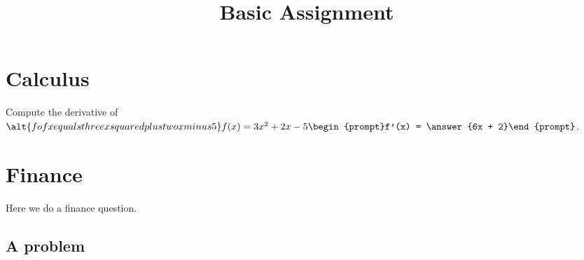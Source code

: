 \documentclass[noauthor,nooutcomes]{ximera}
\title{Basic Assignment}
\begin{document}
\begin{abstract}
\end{abstract}
\maketitle


\section{Calculus}

\begin{problem}
    Compute the derivative of $\alt{f of x equals three x squared plus
      two x minus 5} f(x) = 3x^2 + 2x -
    5 \begin{prompt}f'(x) = \answer{6x + 2}\end{prompt}$.%
\end{problem}

\section{Finance}

Here we do a finance question.

\subsection{A problem}
\end{document}
